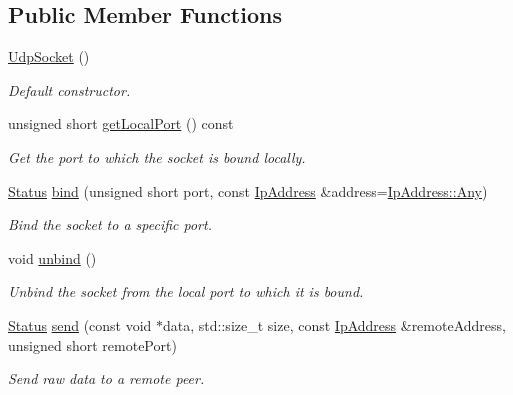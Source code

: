 \subsection*{Public Member Functions}
\begin{DoxyCompactItemize}
\item 
\mbox{\label{classsf_1_1_udp_socket_abb10725e26dee9d3a8165fe87ffb71bb}} 
\hyperlink{classsf_1_1_udp_socket_abb10725e26dee9d3a8165fe87ffb71bb}{Udp\+Socket} ()
\begin{DoxyCompactList}\small\item\em Default constructor. \end{DoxyCompactList}\item 
unsigned short \hyperlink{classsf_1_1_udp_socket_a5c03644b3da34bb763bce93e758c938e}{get\+Local\+Port} () const
\begin{DoxyCompactList}\small\item\em Get the port to which the socket is bound locally. \end{DoxyCompactList}\item 
\hyperlink{classsf_1_1_socket_a51bf0fd51057b98a10fbb866246176dc}{Status} \hyperlink{classsf_1_1_udp_socket_ad764c3d06d90b4714dcc97a0d1647bcc}{bind} (unsigned short port, const \hyperlink{classsf_1_1_ip_address}{Ip\+Address} \&address=\hyperlink{classsf_1_1_ip_address_a3dbc10b0dc6804cc69e29342f7406907}{Ip\+Address\+::\+Any})
\begin{DoxyCompactList}\small\item\em Bind the socket to a specific port. \end{DoxyCompactList}\item 
void \hyperlink{classsf_1_1_udp_socket_a2c4abb8102a1bd31f51fcfe7f15427a3}{unbind} ()
\begin{DoxyCompactList}\small\item\em Unbind the socket from the local port to which it is bound. \end{DoxyCompactList}\item 
\hyperlink{classsf_1_1_socket_a51bf0fd51057b98a10fbb866246176dc}{Status} \hyperlink{classsf_1_1_udp_socket_a664ab8f26f37c21cc4de1b847c2efcca}{send} (const void $\ast$data, std\+::size\+\_\+t size, const \hyperlink{classsf_1_1_ip_address}{Ip\+Address} \&remote\+Address, unsigned short remote\+Port)
\begin{DoxyCompactList}\small\item\em Send raw data to a remote peer. \end{DoxyCompactList}\item 

\end{DoxyCompactItemize}
